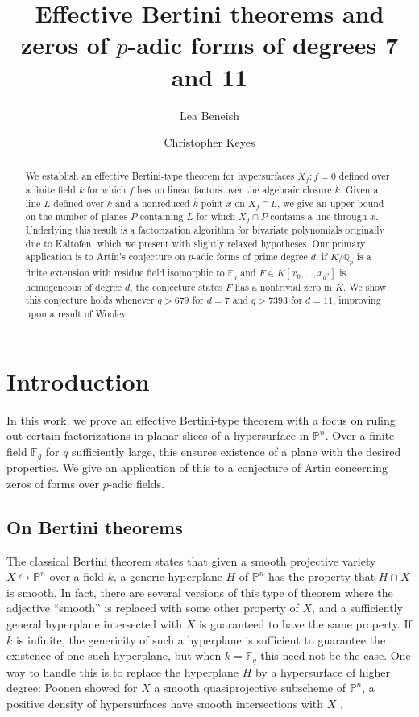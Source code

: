 \documentclass{amsart}
\title{Effective Bertini theorems and zeros of $p$-adic forms of degrees 7 and 11}
\author{Lea Beneish}
\author{Christopher Keyes}
\newcommand{\Q}{\mathbb{Q}}
\newcommand{\F}{\mathbb{F}}
\renewcommand{\P}{\mathbb{P}}
\theoremstyle{definition}
\numberwithin{equation}{section}
\numberwithin{table}{section}
\newcommand{\qbound}[1]{{\color{cyan}$q > {#1}$}}
\renewcommand{\qbound}[1]{{$q > {#1}$}}
\begin{document}
\begin{abstract}
    We establish an effective Bertini-type theorem for hypersurfaces $X_f \colon f = 0$ defined over a finite field $k$ for which $f$ has no linear factors over the algebraic closure $\overline{k}$. Given a line $L$ defined over $k$ and a nonreduced $\overline{k}$-point $x$ on $X_f \cap L$, we give an upper bound on the number of planes $P$ containing $L$ for which $X_f \cap P$ contains a line through $x$. Underlying this result is a factorization algorithm for bivariate polynomials originally due to Kaltofen, which we present with slightly relaxed hypotheses. Our primary application is to Artin's conjecture on $p$-adic forms of prime degree $d$: if $K/\Q_p$ is a finite extension with residue field isomorphic to $\F_q$ and $F \in K[x_0, \ldots, x_{d^2}]$ is homogeneous of degree $d$, the conjecture states $F$ has a nontrivial zero in $K$. We show this conjecture holds whenever \qbound{679} for $d=7$ and \qbound{7393} for $d=11$, improving upon a result of Wooley.
\end{abstract}

\maketitle

\section{Introduction}

In this work, we prove an effective Bertini-type theorem with a focus on ruling out certain factorizations in planar slices of a hypersurface in $\P^n$. Over a finite field $\F_q$ for $q$ sufficiently large, this ensures 
existence of a plane with the desired properties. We give an application of this to a conjecture of Artin concerning zeros of forms over $p$-adic fields.

\subsection{On Bertini theorems}
The classical Bertini theorem states that given a smooth projective variety $X \hookrightarrow \mathbb{P}^n$ over a field $k$, a generic hyperplane $H$ of $\mathbb{P}^n$ has the property that $H\cap X$ is smooth. In fact, there are several versions of this type of theorem where the adjective ``smooth'' is replaced with some other property of $X$, and a sufficiently general hyperplane intersected with $X$ is guaranteed to have the same property. If $k$ is infinite, the genericity of such a hyperplane is sufficient to guarantee the existence of one such hyperplane, but when $k = \F_q$ this need not be the case. One way to handle this is to replace the hyperplane $H$ by a hypersurface of higher degree: Poonen showed for $X$ a smooth quasiprojective subscheme of $\mathbb{P}^n$, a positive density of hypersurfaces have smooth intersections with $X$ \cite{Poonen_Bertini}.
\end{document}
